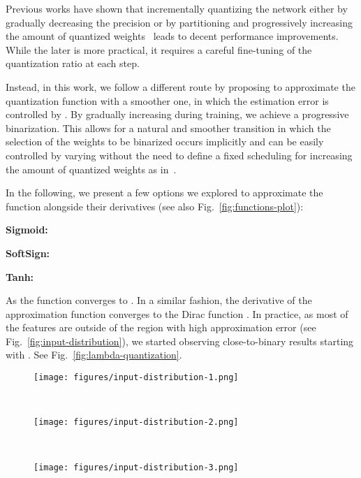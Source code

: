 \documentclass[10pt,twocolumn,letterpaper]{article}
\begin{document}
Previous works have shown that incrementally quantizing the network either by gradually decreasing the precision or by partitioning and progressively increasing the amount of quantized weights~\cite{zhou2017incremental} leads to decent performance improvements. While the later is more practical, it requires a careful fine-tuning of the quantization ratio at each step. 

Instead, in this work, we follow a different route by proposing to approximate the quantization function  with a smoother one, in which the estimation error is controlled by . By gradually increasing  during training, we achieve a progressive binarization. This allows for a natural and smoother transition in which the selection of the weights to be binarized occurs implicitly and can be easily controlled by varying  without the need to define a fixed scheduling for increasing the amount of quantized weights as in~\cite{zhou2017incremental}. 

In the following, we present a few options we explored to approximate the  function alongside their derivatives (see also Fig.~\ref{fig:functions-plot}):

\noindent
\textbf{Sigmoid:}


\noindent
\textbf{SoftSign:}



\noindent
\textbf{Tanh:}



As  the function converges to . In a similar fashion, the derivative of the approximation function converges to the Dirac function . In practice, as most of the features are outside of the region with high approximation error (see Fig.~\ref{fig:input-distribution}), we started observing close-to-binary results starting with . See Fig.~\ref{fig:lambda-quantization}.

\begin{figure*}[!htbp]
    \centering
    \begin{subfigure}[t]{0.3\textwidth}
    \texttt{[image: figures/input-distribution-1.png]}
    \label{fig:input-dist-1}
    \end{subfigure}
    ~
    \begin{subfigure}[t]{0.299\textwidth}
    \texttt{[image: figures/input-distribution-2.png]}
    \label{fig:input-dist-2}
    \end{subfigure}
     ~
     \begin{subfigure}[t]{0.303\textwidth}
    \texttt{[image: figures/input-distribution-3.png]}
    \label{fig:input-dist-3}
    \end{subfigure}
    
    \caption{Input distribution before the  function from 3 layers located at the bottom, middle and top of the network. Most values are in a range  where the approximation function outputs values close to  allowing the approximator to reach good estimates for relatively low values of .}
    \label{fig:input-distribution}
\end{figure*}
\end{document}
